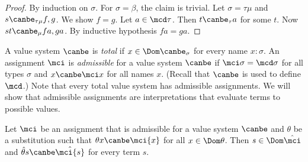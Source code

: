 \begin{proof}
  By induction on $\sigma$.  For $\sigma=\beta$, the
  claim is trivial.  Let $\sigma=\tau\mu$ and
  $s\canbe_{\tau\mu}f,g$.  We show $f=g$.  Let
  $a\in\mcd\tau$.  Then $t\canbe_\tau a$ for some $t$.
  Now $st\canbe_\mu fa,ga$.  By inductive hypothesis
  $fa=ga$.
\end{proof}

A value system $\canbe$ is \emph{total} if
$x\in\Dom\canbe_\sigma$ for every name $x:\sigma$.  An
assignment $\mci$ is \emph{admissible} for a value
system $\canbe$ if $\mci\sigma=\mcd\sigma$ for all
types $\sigma$ and $x\canbe\mci x$ for all names $x$.
(Recall that $\canbe$ is used to define $\mcd$.) Note that every total value system has admissible
assignments.  We will show that admissible
assignments are interpretations that
evaluate terms to possible values.


\begin{lem}
  \label{lem-admissibility}
  Let $\mci$ be an assignment that is admissible
  for a value system $\canbe$ and $\theta$ be a
  substitution such that $\theta{x}\canbe\mci{x}$ for
  all $x\in\Dom\theta$.  Then $s\in\Dom\hat\mci$ and
  $\hat\theta{s}\canbe\hat\mci{s}$ for every term $s$.
\end{lem}

